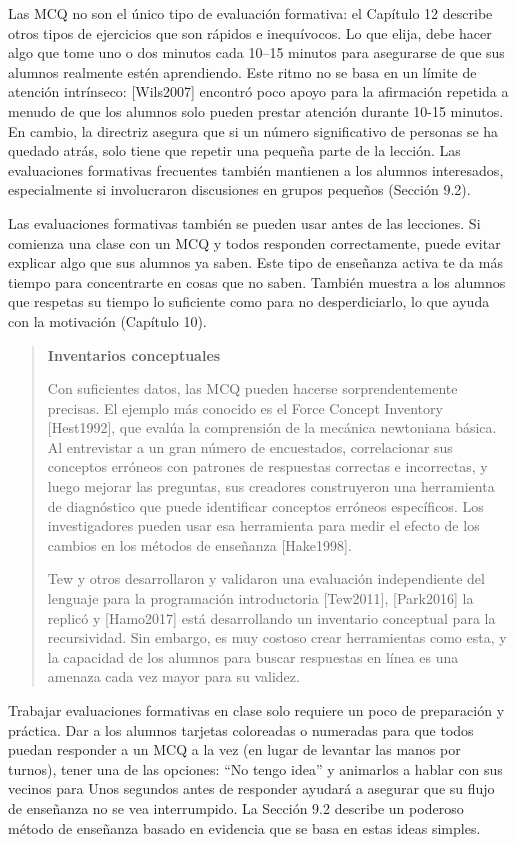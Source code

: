 \documentclass[
]{book}
\begin{document}
Las MCQ no son el único tipo de evaluación formativa: el Capítulo 12 describe otros tipos de ejercicios que son rápidos e inequívocos. Lo que elija, debe hacer algo que tome uno o dos minutos cada 10--15 minutos para asegurarse de que sus alumnos realmente estén aprendiendo. Este ritmo no se basa en un límite de atención intrínseco: {[}Wils2007{]} encontró poco apoyo para la afirmación repetida a menudo de que los alumnos solo pueden prestar atención durante 10-15 minutos. En cambio, la directriz asegura que si un número significativo de personas se ha quedado atrás, solo tiene que repetir una pequeña parte de la lección. Las evaluaciones formativas frecuentes también mantienen a los alumnos interesados, especialmente si involucraron discusiones en grupos pequeños (Sección 9.2).

Las evaluaciones formativas también se pueden usar antes de las lecciones. Si comienza una clase con un MCQ y todos responden correctamente, puede evitar explicar algo que sus alumnos ya saben. Este tipo de enseñanza activa te da más tiempo para concentrarte en cosas que no saben. También muestra a los alumnos que respetas su tiempo lo suficiente como para no desperdiciarlo, lo que ayuda con la motivación (Capítulo 10).

\begin{quote}
\textbf{Inventarios conceptuales}

Con suficientes datos, las MCQ pueden hacerse sorprendentemente precisas. El ejemplo más conocido es el Force Concept Inventory {[}Hest1992{]}, que evalúa la comprensión de la mecánica newtoniana básica. Al entrevistar a un gran número de encuestados, correlacionar sus conceptos erróneos con patrones de respuestas correctas e incorrectas, y luego mejorar las preguntas, sus creadores construyeron una herramienta de diagnóstico que puede identificar conceptos erróneos específicos. Los investigadores pueden usar esa herramienta para medir el efecto de los cambios en los métodos de enseñanza {[}Hake1998{]}.

Tew y otros desarrollaron y validaron una evaluación independiente del lenguaje para la programación introductoria {[}Tew2011{]}, {[}Park2016{]} la replicó y {[}Hamo2017{]} está desarrollando un inventario conceptual para la recursividad. Sin embargo, es muy costoso crear herramientas como esta, y la capacidad de los alumnos para buscar respuestas en línea es una amenaza cada vez mayor para su validez.
\end{quote}

Trabajar evaluaciones formativas en clase solo requiere un poco de preparación y práctica. Dar a los alumnos tarjetas coloreadas o numeradas para que todos puedan responder a un MCQ a la vez (en lugar de levantar las manos por turnos), tener una de las opciones: ``No tengo idea'' y animarlos a hablar con sus vecinos para Unos segundos antes de responder ayudará a asegurar que su flujo de enseñanza no se vea interrumpido. La Sección 9.2 describe un poderoso método de enseñanza basado en evidencia que se basa en estas ideas simples.
\end{document}

